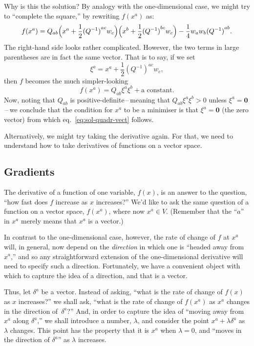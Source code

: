 \documentclass[10pt, a4paper]{article}
\newcommand{\bzero}{\mathbold{0}} %
\begin{document}
Why is this the solution? By analogy with the one-dimensional case, we
might try to “complete the square,” by rewriting $f(x^a)$ as:
\begin{equation*}
  f(x^a) = Q_{ab}\Bigl(x^a +
  \frac{1}{2}{(Q^{-1})}^{ac}w_c\Bigr)\Bigl(x^b +
  \frac{1}{2}{(Q^{-1})}^{bc}w_c\Bigr) - \frac{1}{4}w_aw_b{(Q^{-1})}^{ab}.
\end{equation*}
The right-hand side looks rather complicated. However, the two terms
in large parentheses are in fact the same vector. That is to say, if
we set
\begin{equation*}
  \xi^a = x^a +  \frac{1}{2}{(Q^{-1})}^{ac}w_c,
\end{equation*}
then $f$ becomes the much simpler-looking
\begin{equation*}
  f(x^a) = Q_{ab}\xi^a\xi^b + \text{a constant}.
\end{equation*}
Now, noting that $Q_{ab}$ is positive-definite\,--\,meaning that
$Q_{ab}\xi^a\xi^b >0$ unless $\xi^a=\bzero$\,--\,we conclude that the condition
for $x^a$ to be a minimiser is that $\xi^a = \bzero$ (the zero vector)
from which eq.~\eqref{eq:sol-quadr-vect} follows.

Alternatively, we might try taking the derivative again. For that, we
need to understand how to take derivatives of functions on a vector
space.

\subsection{Gradients}

The derivative of a function of one variable, $f(x)$, is an answer to
the question, “how fast does $f$ increase as $x$ increases?” We'd like
to ask the same question of a function on a vector space, $f(x^a)$,
where now $x^a\in V$. (Remember that the “$a$” in $x^a$ merely means
that $x^a$ is a vector.)

In contrast to the one-dimensional case, however, the rate of change
of $f$ at $x^a$ will, in general, now depend on the \emph{direction}
in which one is “headed away from~$x^a$,” and so any straightforward
extension of the one-dimensional derivative will need to specify such
a direction.  Fortunately, we have a convenient object with which to
capture the idea of a direction, and that is a vector.

Thus, let $\delta^a$ be a vector. Instead of asking, ``what is the rate of
change of $f(x)$ as $x$ increases?'' we shall ask, ``what is the rate
of change of $f(x^a)$ as $x^a$ changes in the direction
of~$\delta^a$?'' And, in order to capture the idea of ``moving away
from $x^a$ along $\delta^a$,'' we shall introduce a number, $\lambda$, and
consider the point $x^a+\lambda\delta^a$ as $\lambda$ changes. This point has the
property that it is $x^a$ when $\lambda=0$, and ``moves in the direction of
$\delta^a$'' as $\lambda$ increases.
\end{document}
